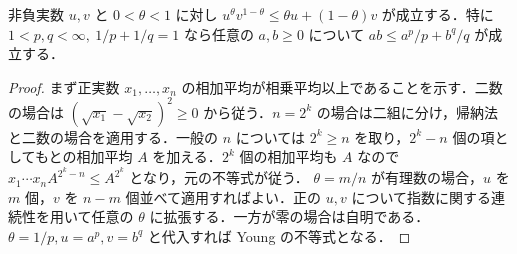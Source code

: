 \begin{prop}[重み付き相加相乗平均不等式とYoungの不等式]
非負実数 $u,v$ と $0<\theta<1$ に対し $u^\theta v^{1-\theta}\leq\theta u+(1-\theta)v$ が成立する．特に $1<p,q<\infty,\ 1/p+1/q=1$ なら任意の $a,b\geq0$ について $ab\leq a^p/p+b^q/q$ が成立する．
\end{prop}
\begin{proof}
まず正実数 $x_1,\ldots,x_n$ の相加平均が相乗平均以上であることを示す．二数の場合は $(\sqrt{x_1}-\sqrt{x_2})^2\geq0$ から従う．$n=2^k$ の場合は二組に分け，帰納法と二数の場合を適用する．一般の $n$ については $2^k\geq n$ を取り，$2^k-n$ 個の項としてもとの相加平均 $A$ を加える．$2^k$ 個の相加平均も $A$ なので $x_1\cdots x_n A^{2^k-n}\leq A^{2^k}$ となり，元の不等式が従う．
$\theta=m/n$ が有理数の場合，$u$ を $m$ 個，$v$ を $n-m$ 個並べて適用すればよい．正の $u,v$ について指数に関する連続性を用いて任意の $\theta$ に拡張する．一方が零の場合は自明である．$\theta=1/p,u=a^p,v=b^q$ と代入すれば Young の不等式となる．
\end{proof}
